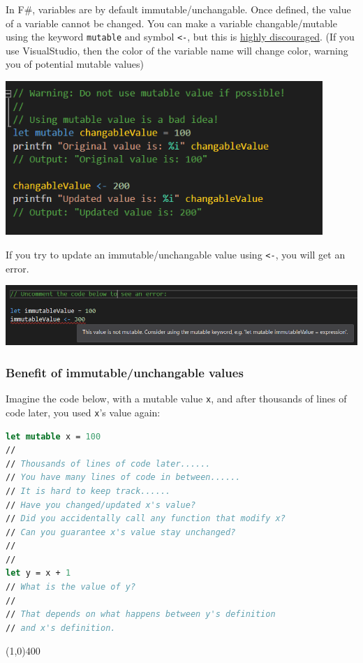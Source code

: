 \documentclass[12pt]{article}
\begin{document}
In F\#, variables are by default immutable/unchangable. Once defined, the value of a variable cannot be changed. You can make a variable changable/mutable using the keyword \texttt{mutable} and symbol \texttt{<-}, but this is \underline{highly discouraged}. (If you use VisualStudio, then the color of the variable name will change color, warning you of potential mutable values)

\begin{center}
\includegraphics[width=12cm]{pictures/picture02.png}
\end{center}

\vfill

\pagebreak

If you try to update an immutable/unchangable value using \texttt{<-}, you will get an error. 

\begin{center}
\includegraphics[width=16cm]{pictures/picture03.png}
\end{center}

\subsubsection*{Benefit of immutable/unchangable values}

Imagine the code below, with a mutable value \texttt{x}, and after thousands of lines of code later, you used \texttt{x}'s value again:

\begin{lstlisting}[language=FSharp]
let mutable x = 100
//
// Thousands of lines of code later......
// You have many lines of code in between......
// It is hard to keep track......
// Have you changed/updated x's value?
// Did you accidentally call any function that modify x?
// Can you guarantee x's value stay unchanged?
// 
//
let y = x + 1
// What is the value of y?
//
// That depends on what happens between y's definition 
// and x's definition.
\end{lstlisting}
\begin{center}
\line(1,0){400}
\end{center}
\end{document}
